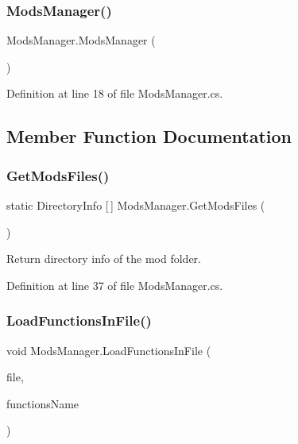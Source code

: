 \subsubsection{\texorpdfstring{Mods\+Manager()}{ModsManager()}}
{\footnotesize\ttfamily Mods\+Manager.\+Mods\+Manager (\begin{DoxyParamCaption}{ }\end{DoxyParamCaption})}



Definition at line 18 of file Mods\+Manager.\+cs.



\subsection{Member Function Documentation}
\mbox{\label{class_mods_manager_aa4744c5ca479dbb289c489fadcae0f4e}} 
\subsubsection{\texorpdfstring{Get\+Mods\+Files()}{GetModsFiles()}}
{\footnotesize\ttfamily static Directory\+Info \mbox{[}$\,$\mbox{]} Mods\+Manager.\+Get\+Mods\+Files (\begin{DoxyParamCaption}{ }\end{DoxyParamCaption})\hspace{0.3cm}{\ttfamily [static]}}



Return directory info of the mod folder. 



Definition at line 37 of file Mods\+Manager.\+cs.

\mbox{\label{class_mods_manager_a6c8466dcd3758a6261c2a1778d09377d}} 
\subsubsection{\texorpdfstring{Load\+Functions\+In\+File()}{LoadFunctionsInFile()}}
{\footnotesize\ttfamily void Mods\+Manager.\+Load\+Functions\+In\+File (\begin{DoxyParamCaption}\item[{File\+Info}]{file,  }\item[{string}]{functions\+Name }\end{DoxyParamCaption})}



